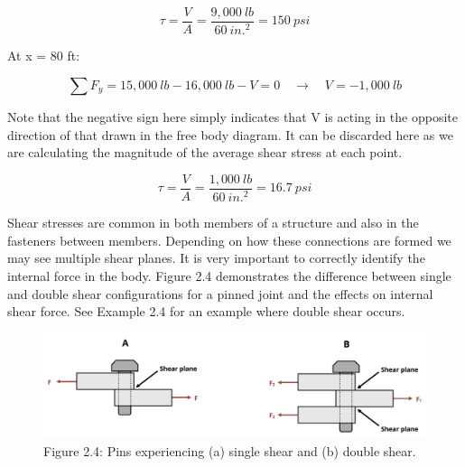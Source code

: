 \documentclass[
  letterpaper,
  DIV=11,
  numbers=noendperiod]{scrreprt}
\theoremstyle{definition}
\theoremstyle{remark}
\begin{document}
\begin{tcolorbox}
\begin{tcolorbox}
\[
\tau=\frac{V}{A}=\frac{9,000{~lb}}{60{~in.}^2}=150{~psi}
\]

At x = 80 ft:

\[
\sum F_y=15,000{~lb}-16,000{~lb}-V=0 \quad \rightarrow \quad V=-1,000{~lb}
\]

Note that the negative sign here simply indicates that V is acting in
the opposite direction of that drawn in the free body diagram. It can be
discarded here as we are calculating the magnitude of the average shear
stress at each point.

\[
\tau=\frac{V}{A}=\frac{1,000{~lb}}{60{~in.}^2}=16.7{~psi}
\]

\end{tcolorbox}

\end{tcolorbox}

Shear stresses are common in both members of a structure and also in the
fasteners between members. Depending on how these connections are formed
we may see multiple shear planes. It is very important to correctly
identify the internal force in the body. Figure 2.4 demonstrates the
difference between single and double shear configurations for a pinned
joint and the effects on internal shear force. See Example 2.4 for an
example where double shear occurs.

\begin{figure}[H]

{\centering \includegraphics{images/CH2 figures/2.4.png}

}

\caption{Figure 2.4: Pins experiencing (a) single shear and (b) double
shear.}

\end{figure}%
\end{document}
